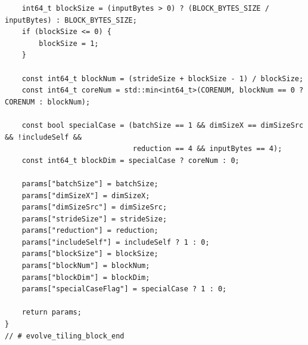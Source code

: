 \documentclass{article}
\theoremstyle{plain}
\theoremstyle{definition}
\theoremstyle{remark}
\begin{document}
\begin{tcolorbox}
\begin{lstlisting}
    int64_t blockSize = (inputBytes > 0) ? (BLOCK_BYTES_SIZE / inputBytes) : BLOCK_BYTES_SIZE;
    if (blockSize <= 0) {
        blockSize = 1;
    }

    const int64_t blockNum = (strideSize + blockSize - 1) / blockSize;
    const int64_t coreNum = std::min<int64_t>(CORENUM, blockNum == 0 ? CORENUM : blockNum);

    const bool specialCase = (batchSize == 1 && dimSizeX == dimSizeSrc && !includeSelf &&
                              reduction == 4 && inputBytes == 4);
    const int64_t blockDim = specialCase ? coreNum : 0;

    params["batchSize"] = batchSize;
    params["dimSizeX"] = dimSizeX;
    params["dimSizeSrc"] = dimSizeSrc;
    params["strideSize"] = strideSize;
    params["reduction"] = reduction;
    params["includeSelf"] = includeSelf ? 1 : 0;
    params["blockSize"] = blockSize;
    params["blockNum"] = blockNum;
    params["blockDim"] = blockDim;
    params["specialCaseFlag"] = specialCase ? 1 : 0;

    return params;
}
// # evolve_tiling_block_end

\end{lstlisting}
\end{tcolorbox}
\label{fig:appendix_tiling_code}
\end{document}
